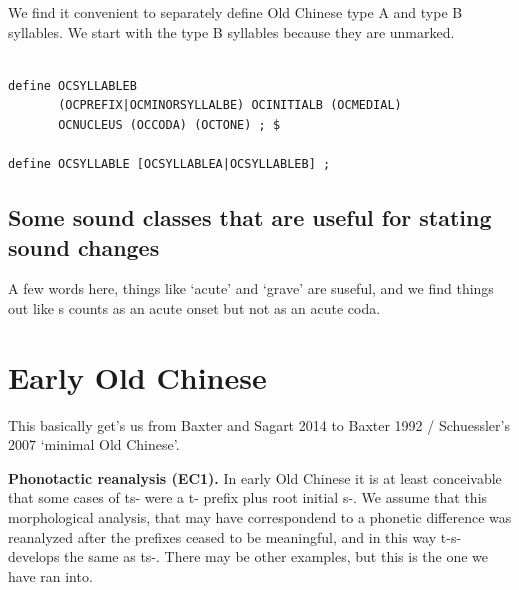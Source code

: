\documentclass[xetex, svgnames, 12pt]{scrartcl}
\newcounter{para}
\newcommand\mypara[1]{\par\refstepcounter{para}\textbf{\thepara\space#1\space}}
\begin{document}
We find it convenient to separately define Old Chinese type A and type B syllables. We start with the type B syllables because they are unmarked. 

\begin{verbatim}

define OCSYLLABLEB 
       (OCPREFIX|OCMINORSYLLALBE) OCINITIALB (OCMEDIAL)
       OCNUCLEUS (OCCODA) (OCTONE) ; $

define OCSYLLABLE [OCSYLLABLEA|OCSYLLABLEB] ;
\end{verbatim}

\subsection{
Some sound classes that are useful for stating sound changes}
A few words here, things like `acute' and `grave' are suseful, and we find things out like s counts as an acute onset but not as an acute coda. 
%








\section{Early Old Chinese}
This basically get's us from Baxter and Sagart 2014 to Baxter 1992 / Schuessler's 2007 `minimal Old Chinese'. 

\mypara{Phonotactic reanalysis (EC1).}
In early Old Chinese it is at least conceivable that some cases of ts- were a t- prefix 
plus root initial s-. We assume that this morphological analysis, that may have correspondend
to a phonetic difference was reanalyzed after the prefixes ceased to be meaningful, and in this way
t-s- develops the same as ts-. There may be other examples, but this is the one we have ran into.
\end{document}
